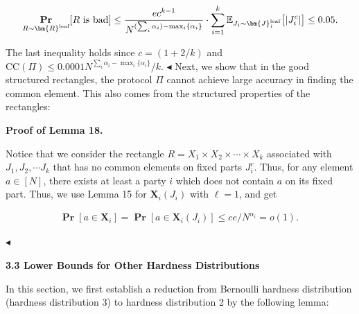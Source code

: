 \[\begin{gathered}
\operatorname*{\mathbf{Pr}}_{R\sim\bm{R}^{\text{leaf}}}[R\text{ is bad}]\leq\frac{ec^{k-1}}{N^{(\sum_{i}\alpha_{i})-\mathop{\max}_{i}\{\alpha_{i}\}}}\cdot\sum_{i=1}^{k}\mathbb{E}_{J_{i}\sim\bm{J}_{i}^{\text{leaf}}}\big{[}|J_{i}^{c}|\big{]}\leq 0.05.
\end{gathered}\]


The last inequality holds since $c=(1+2/k)$ and $\text{CC}(\Pi)\leq 0.0001N^{\sum_{i}{\alpha_{i}}-\mathop{\max}_{i}\{\alpha_{i}\}}/k$.
$\blacktriangleleft$
Next, we show that in the good structured rectangles, the protocol $\Pi$ cannot achieve large accuracy in finding the common element. This also comes from the structured properties of the rectangles:\par





\par\medskip\noindent\textbf{Proof of Lemma 18.}\par




Notice that we consider the rectangle $R=X_{1}\times X_{2}\times\cdots\times X_{k}$ associated with $J_{1},J_{2},\cdots J_{k}$ that has no common elements on fixed parts $J_{i}^{c}$. Thus, for any element $a\in[N]$, there exists at least a party $i$ which does not contain $a$ on its fixed part. Thus, we use Lemma 15 for $\bm{X}_{i}(J_{i})$ with $\ell=1$, and get\par


\[\begin{gathered}
\operatorname*{\mathbf{Pr}}[a\in\bm{X}_{i}]=\operatorname*{\mathbf{Pr}}[a\in\bm{X}_{i}(J_{i})]\leq ce/N^{\alpha_{i}}=o(1).\
\end{gathered}\]


$\blacktriangleleft$\par






\par\medskip\noindent\textbf{
3.3 Lower Bounds for Other Hardness Distributions}\par




In this section, we first establish a reduction from Bernoulli hardness distribution (hardness distribution 3) to hardness distribution 2 by the following lemma:\par



